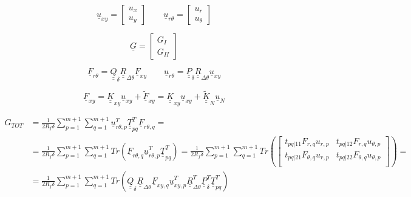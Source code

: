 \documentclass[a4paper]{jpconf}
\begin{document}
\begin{equation}
\underline{u}_{xy}=\begin{bmatrix}
u_{x} \\
u_{y}
\end{bmatrix}\qquad\underline{u}_{r\theta}=\begin{bmatrix}
u_{r} \\
u_{\theta}
\end{bmatrix}
\end{equation}

\begin{equation}
\underline{G}=\begin{bmatrix}
G_{I} \\
G_{II}
\end{bmatrix}
\end{equation}

\begin{equation}
\underline{F}_{r\theta}=\underline{\underline{Q}}_{\delta}\underline{\underline{R}}_{\Delta\theta}\underline{F}_{xy}\qquad\underline{u}_{r\theta}=\underline{\underline{P}}_{\delta}\underline{\underline{R}}_{\Delta\theta}\underline{u}_{xy}
\end{equation}

\begin{equation}
\underline{F}_{xy}=\underline{\underline{K}}_{xy}\underline{u}_{xy}+\underline{\widetilde{F}}_{xy}=\underline{\underline{K}}_{xy}\underline{u}_{xy}+\underline{\underline{\widetilde{K}}}_{N}\underline{u}_{N}
\end{equation}

\begin{equation}
\begin{split}
G_{TOT} &= \frac{1}{2R_{f}\delta}\sum_{p=1}^{m+1}\sum_{q=1}^{m+1}\underline{u}_{r\theta,p}^{T}\underline{\underline{T}}_{pq}^{T}\underline{F}_{r\theta,q}=\\
&=\frac{1}{2R_{f}\delta}\sum_{p=1}^{m+1}\sum_{q=1}^{m+1}Tr\left(\underline{F}_{r\theta,q}\underline{u}_{r\theta,p}^{T}\underline{\underline{T}}_{pq}^{T}\right)=\frac{1}{2R_{f}\delta}\sum_{p=1}^{m+1}\sum_{q=1}^{m+1}Tr\left(\begin{bmatrix}
t_{pq|11}F_{r,q}u_{r,p}&t_{pq|12}F_{r,q}u_{\theta,p}\\
t_{pq|21}F_{\theta,q}u_{r,p}&t_{pq|22}F_{\theta,q}u_{\theta,p}\\
\end{bmatrix}\right)=\\
&=\frac{1}{2R_{f}\delta}\sum_{p=1}^{m+1}\sum_{q=1}^{m+1}Tr\left(\underline{\underline{Q}}_{\delta}\underline{\underline{R}}_{\Delta\theta}\underline{F}_{xy,q}\underline{u}_{xy,p}^{T}\underline{\underline{R}}_{\Delta\theta}^{T}\underline{\underline{P}}_{\delta}^{T}\underline{\underline{T}}_{pq}^{T}\right)
\end{split}
\end{equation}
\end{document}
